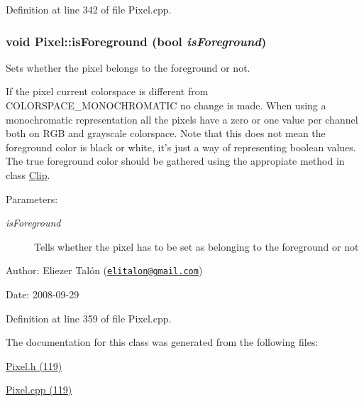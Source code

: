 Definition at line 342 of file Pixel.cpp.\hypertarget{class_pixel_1b1d5b2ed9285b837d85c33f09cab3f9}{
\subsubsection[isForeground]{\setlength{\rightskip}{0pt plus 5cm}void Pixel::isForeground (bool {\em isForeground})}}
\label{class_pixel_1b1d5b2ed9285b837d85c33f09cab3f9}


Sets whether the pixel belongs to the foreground or not. 

If the pixel current colorspace is different from COLORSPACE\_\-MONOCHROMATIC no change is made. When using a monochromatic representation all the pixels have a zero or one value per channel both on RGB and grayscale colorspace. Note that this does not mean the foreground color is black or white, it's just a way of representing boolean values. The true foreground color should be gathered using the appropiate method in class \hyperlink{class_clip}{Clip}.

\begin{Desc}
\item[Parameters:]
\begin{description}
\item[{\em isForeground}]Tells whether the pixel has to be set as belonging to the foreground or not\end{description}
\end{Desc}
\begin{Desc}
\item[Author:]Eliezer Talón (\href{mailto:elitalon@gmail.com}{\tt elitalon@gmail.com}) \end{Desc}
\begin{Desc}
\item[Date:]2008-09-29 \end{Desc}


Definition at line 359 of file Pixel.cpp.

The documentation for this class was generated from the following files:\begin{CompactItemize}
\item 
\hyperlink{_pixel_8h}{Pixel.h (119)}\item 
\hyperlink{_pixel_8cpp}{Pixel.cpp (119)}\end{CompactItemize}
